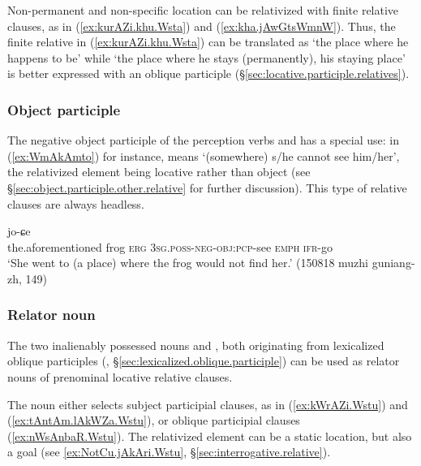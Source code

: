 Non-permanent and non-specific location can be relativized with finite relative clauses, as in (\ref{ex:kurAZi.khu.Wsta}) and (\ref{ex:kha.jAwGtsWmnW}). Thus, the finite relative  in (\ref{ex:kurAZi.khu.Wsta}) can be translated as `the place where he happens to be' while `the place where he stays (permanently), his staying place' is better expressed with an oblique participle  (§\ref{sec:locative.participle.relatives}).
 
\subsubsection{Object participle} \label{sec:locative.relativization.object}
The negative object participle of the perception verbs  and  has a special use: in (\ref{ex:WmAkAmto}) for instance,  means `(somewhere) s/he cannot see him/her', the relativized element being locative rather than object  (see §\ref{sec:object.participle.other.relative} for further discussion). This type of relative clauses are always headless.

\begin{exe}
\ex \label{ex:WmAkAmto}
 jo-ɕe  \\
the.aforementioned frog \textsc{erg} \textsc{3sg}.\textsc{poss}-\textsc{neg}-\textsc{obj}:\textsc{pcp}-see \textsc{emph} \textsc{ifr}-go   \\
\glt `She went to (a place) where the frog would not find her.' (150818 muzhi guniang-zh, 149)
\end{exe}

\subsubsection{Relator noun} \label{sec:Wstu.relativization.subject}
The two inalienably possessed nouns   and , both originating from lexicalized oblique participles (, §\ref{sec:lexicalized.oblique.participle}) can be used as relator nouns of prenominal locative relative clauses.

The noun  either selects subject participial clauses, as in (\ref{ex:kWrAZi.Wstu}) and (\ref{ex:tAntAm.lAkWZa.Wstu}), or oblique participial clauses (\ref{ex:nWsAnbaR.Wstu}). The relativized element can be a static location, but also a goal (see \ref{ex:NotCu.jAkAri.Wstu}, §\ref{sec:interrogative.relative}).
 
